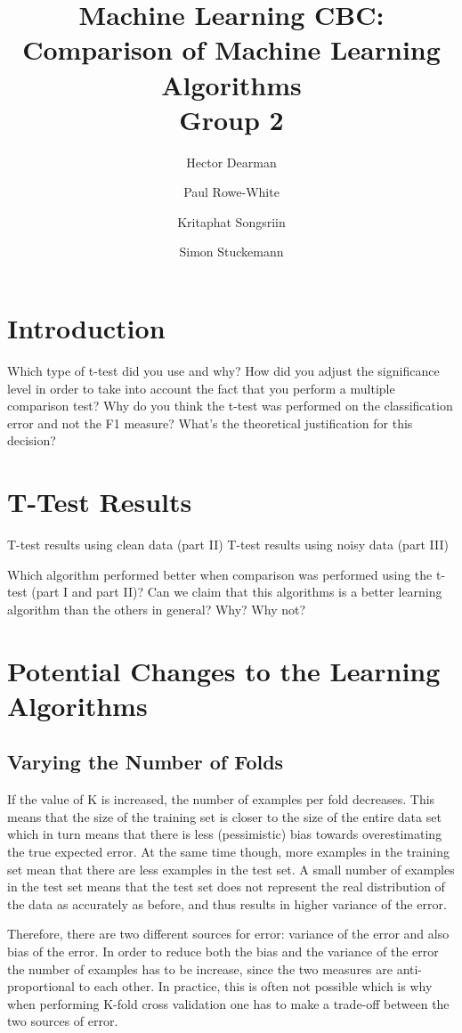 \documentclass[10pt,a4paper]{article}
\author{Hector Dearman \and Paul Rowe-White \and Kritaphat Songsriin \and Simon Stuckemann}
\title{Machine Learning CBC: Comparison of Machine Learning Algorithms\\Group 2}
\begin{document}
\maketitle

\section{Introduction}
Which type of t-test did you use and why?
How did you adjust the significance level in order to take into account the fact that you perform a multiple comparison test?
Why do you think the t-test was performed on the classification error and not the F1 measure? What's the theoretical justification for this decision?

\section{T-Test Results}
T-test results using clean data (part II)
T-test results using noisy data (part III)

Which algorithm performed better when comparison was performed using the t-test (part I and part II)? Can we claim that this algorithms is a better learning algorithm than the others in general? Why? Why not?

\section{Potential Changes to the Learning Algorithms}
\subsection{Varying the Number of Folds}
If the value of K is increased, the number of examples per fold decreases. This means that the size of the training set is closer to the size of the entire data set which in turn means that there is less (pessimistic) bias towards overestimating the true expected error. At the same time though, more examples in the training set mean that there are less examples in the test set. A small number of examples in the test set means that the test set does not represent the real distribution of the data as accurately as before, and thus results in higher variance of the error.

Therefore, there are two different sources for error: variance of the error and also bias of the error. In order to reduce both the bias and the variance of the error the number of examples has to be increase, since the two measures are anti-proportional to each other. In practice, this is often not possible which is why when performing K-fold cross validation one has to make a trade-off between the two sources of error. 
\end{document}
